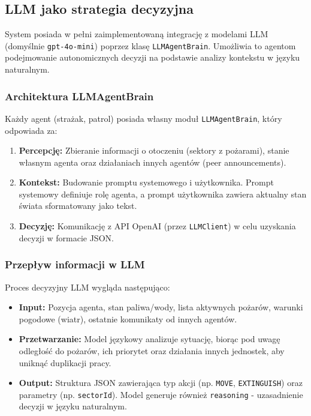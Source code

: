 \subsection{LLM jako strategia decyzyjna}

System posiada w pełni zaimplementowaną integrację z modelami LLM (domyślnie \texttt{gpt-4o-mini}) poprzez klasę \texttt{LLMAgentBrain}. Umożliwia to agentom podejmowanie autonomicznych decyzji na podstawie analizy kontekstu w języku naturalnym.

\subsubsection{Architektura LLMAgentBrain}

Każdy agent (strażak, patrol) posiada własny moduł \texttt{LLMAgentBrain}, który odpowiada za:
\begin{enumerate}
    \item \textbf{Percepcję:} Zbieranie informacji o otoczeniu (sektory z pożarami), stanie własnym agenta oraz działaniach innych agentów (peer announcements).
    \item \textbf{Kontekst:} Budowanie promptu systemowego i użytkownika. Prompt systemowy definiuje rolę agenta, a prompt użytkownika zawiera aktualny stan świata sformatowany jako tekst.
    \item \textbf{Decyzję:} Komunikację z API OpenAI (przez \texttt{LLMClient}) w celu uzyskania decyzji w formacie JSON.
\end{enumerate}

\subsubsection{Przepływ informacji w LLM}

Proces decyzyjny LLM wygląda następująco:
\begin{itemize}
    \item \textbf{Input:} Pozycja agenta, stan paliwa/wody, lista aktywnych pożarów, warunki pogodowe (wiatr), ostatnie komunikaty od innych agentów.
    \item \textbf{Przetwarzanie:} Model językowy analizuje sytuację, biorąc pod uwagę odległość do pożarów, ich priorytet oraz działania innych jednostek, aby uniknąć duplikacji pracy.
    \item \textbf{Output:} Struktura JSON zawierająca typ akcji (np. \texttt{MOVE}, \texttt{EXTINGUISH}) oraz parametry (np. \texttt{sectorId}). Model generuje również \texttt{reasoning} - uzasadnienie decyzji w języku naturalnym.
\end{itemize}

